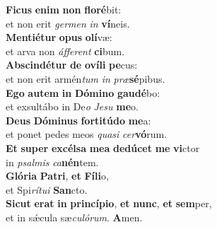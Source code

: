 \oddverse \textbf{Fi}\textbf{cus} \textbf{e}\textbf{nim} \textbf{non} \textbf{flo}\textbf{ré}bit:~\*\\
\oddverse et non erit \textit{ger}\textit{men} \textit{in} \textbf{ví}neis.\\
\evenverse \textbf{Men}\textbf{ti}\textbf{é}\textbf{tur} \textbf{o}\textbf{pus} \textbf{o}\textbf{lí}væ:~\*\\
\evenverse et arva non \textit{áf}\textit{fe}\textit{rent} \textbf{ci}bum.\\
\oddverse \textbf{Ab}\textbf{scin}\textbf{dé}\textbf{tur} \textbf{de} \textbf{o}\textbf{ví}\textbf{li} \textbf{pe}cus:~\*\\
\oddverse et non erit armén\textit{tum} \textit{in} \textit{præ}\textbf{sé}pibus.\\
\evenverse \textbf{E}\textbf{go} \textbf{au}\textbf{tem} \textbf{in} \textbf{Dó}\textbf{mi}\textbf{no} \textbf{gau}\textbf{dé}bo:~\*\\
\evenverse et exsultábo in De\textit{o} \textit{Je}\textit{su} \textbf{me}o.\\
\oddverse \textbf{De}\textbf{us} \textbf{Dó}\textbf{mi}\textbf{nus} \textbf{for}\textbf{ti}\textbf{tú}\textbf{do} \textbf{me}a:~\*\\
\oddverse et ponet pedes meos \textit{qua}\textit{si} \textit{cer}\textbf{vó}rum.\\
\evenverse \textbf{Et} \textbf{su}\textbf{per} \textbf{ex}\textbf{cél}\textbf{sa} \textbf{me}\textbf{a} \textbf{de}\textbf{dú}\textbf{cet} \textbf{me} \textbf{vi}ctor~\*\\
\evenverse in \textit{psal}\textit{mis} \textit{ca}\textbf{nén}tem.\\
\oddverse \textbf{Gló}\textbf{ri}\textbf{a} \textbf{Pa}\textbf{tri}, \textbf{et} \textbf{Fí}\textbf{li}o,~\*\\
\oddverse et Spi\textit{rí}\textit{tu}\textit{i} \textbf{San}cto.\\
\evenverse \textbf{Si}\textbf{cut} \textbf{e}\textbf{rat} \textbf{in} \textbf{prin}\textbf{cí}\textbf{pi}\textbf{o}, \textbf{et} \textbf{nunc}, \textbf{et} \textbf{sem}per,~\*\\
\evenverse et in sǽcula sæ\textit{cu}\textit{ló}\textit{rum}. \textbf{A}men.\\
